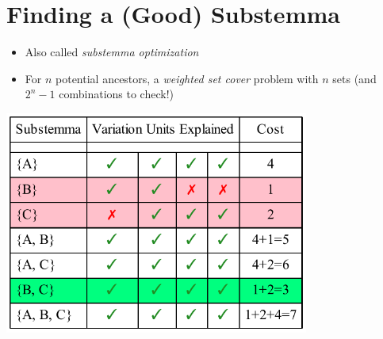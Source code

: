 \documentclass[10pt]{beamer}
\begin{document}
	\section*{Finding a (Good) Substemma}
	\begin{frame}
		\begin{itemize}
			\item Also called \emph{substemma optimization}
			\item For $n$ potential ancestors, a \emph{weighted set cover} problem with $n$ sets (and $2^n - 1$ combinations to check!)
		\end{itemize}
		\begin{center}
			\includegraphics[width=0.75\textwidth]{../img/weighted-set-cover.pdf}
		\end{center}
	\end{frame}
\end{document}
